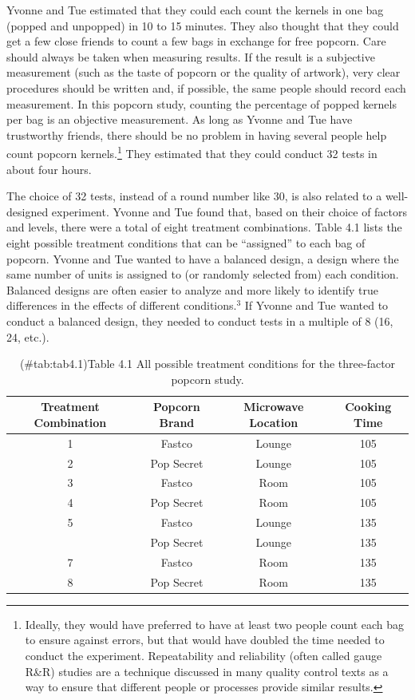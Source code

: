 \documentclass[
]{report}
\begin{document}
Yvonne and Tue estimated that they could each count the kernels in one bag (popped and unpopped) in 10 to 15 minutes. They also thought that they could get a few close friends to count a few bags in exchange for free popcorn. Care should always be taken when measuring results. If the result is a subjective measurement (such as the taste of popcorn or the quality of artwork), very clear procedures should be written and, if possible, the same people should record each measurement. In this popcorn study, counting the percentage of popped kernels per bag is an objective measurement. As long as Yvonne and Tue have trustworthy friends, there should be no problem in having several people help count popcorn kernels.\footnote{Ideally, they would have preferred to have at least two people count each bag to ensure against errors, but that would have doubled the time needed to conduct the experiment. Repeatability and reliability (often called gauge R\&R) studies are a technique discussed in many quality control texts as a way to ensure that different people or processes provide similar results.
  \normalsize} They estimated that they could conduct 32 tests in about four hours.

The choice of 32 tests, instead of a round number like 30, is also related to a well-designed experiment. Yvonne and Tue found that, based on their choice of factors and levels, there were a total of eight treatment combinations. Table 4.1 lists the eight possible treatment conditions that can be ``assigned'' to each bag of popcorn. Yvonne and Tue wanted to have a balanced design, a design where the same number of units is assigned to (or randomly selected from) each condition. Balanced designs are often easier to analyze and more likely to identify true differences in the effects of different conditions.\(^3\) If Yvonne and Tue wanted to conduct a balanced design, they needed to conduct tests in a multiple of 8 (16, 24, etc.).

\begin{table}[!h]
\centering
\caption{(\#tab:tab4.1)Table 4.1 All possible treatment conditions for the three-factor popcorn study.}
\centering
\begin{tabular}[t]{cccc}
\toprule
Treatment Combination & Popcorn Brand & Microwave Location & Cooking Time\\
\midrule
1 & Fastco & Lounge & 105\\
2 & Pop Secret & Lounge & 105\\
3 & Fastco & Room & 105\\
4 & Pop Secret & Room & 105\\
5 & Fastco & Lounge & 135\\
\addlinespace
6 & Pop Secret & Lounge & 135\\
7 & Fastco & Room & 135\\
8 & Pop Secret & Room & 135\\
\bottomrule
\end{tabular}
\end{table}
\end{document}
